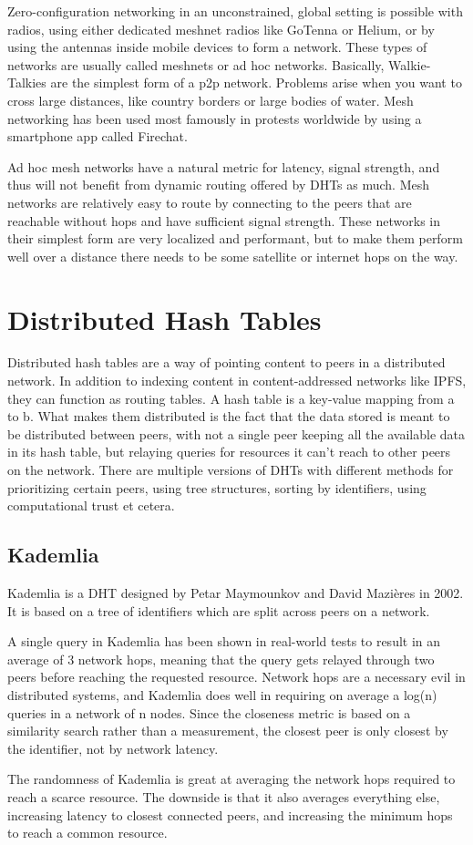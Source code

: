 Zero-configuration networking in an unconstrained, global setting is possible with radios, using either dedicated meshnet radios like GoTenna or Helium, or by using the antennas inside mobile devices to form a network. These types of networks are usually called meshnets or ad hoc networks. Basically, Walkie-Talkies are the simplest form of a p2p network. Problems arise when you want to cross large distances, like country borders or large bodies of water. Mesh networking has been used most famously in protests worldwide by using a smartphone app called Firechat.\cite{Milian2014-mt}

Ad hoc mesh networks have a natural metric for latency, signal strength, and thus will not benefit from dynamic routing offered by DHTs as much. Mesh networks are relatively easy to route by connecting to the peers that are reachable without hops and have sufficient signal strength. These networks in their simplest form are very localized and performant, but to make them perform well over a distance there needs to be some satellite or internet hops on the way. 

\section{Distributed Hash Tables}
Distributed hash tables are a way of pointing content to peers in a distributed network. In addition to indexing content in content-addressed networks like IPFS, they can function as routing tables. A hash table is a key-value mapping from a to b. What makes them distributed is the fact that the data stored is meant to be distributed between peers, with not a single peer keeping all the available data in its hash table, but relaying queries for resources it can't reach to other peers on the network. There are multiple versions of DHTs with different methods for prioritizing certain peers, using tree structures, sorting by identifiers, using computational trust et cetera. 
						
\subsection{Kademlia}
Kademlia is a DHT designed by Petar Maymounkov and David Mazières in 2002. It is based on a tree of identifiers which are split across peers on a network.
						
A single query in Kademlia has been shown in real-world tests to result in an average of 3 network hops, meaning that the query gets relayed through two peers before reaching the requested resource.\cite{Roos2013-mb} Network hops are a necessary evil in distributed systems, and Kademlia does well in requiring on average a log(n) queries in a network of n nodes. Since the closeness metric is based on a similarity search rather than a measurement, the closest peer is only closest by the identifier, not by network latency.\cite{Eigenmann2020-zm}
						
The randomness of Kademlia is great at averaging the network hops required to reach a scarce resource. The downside is that it also averages everything else, increasing latency to closest connected peers, and increasing the minimum hops to reach a common resource.
